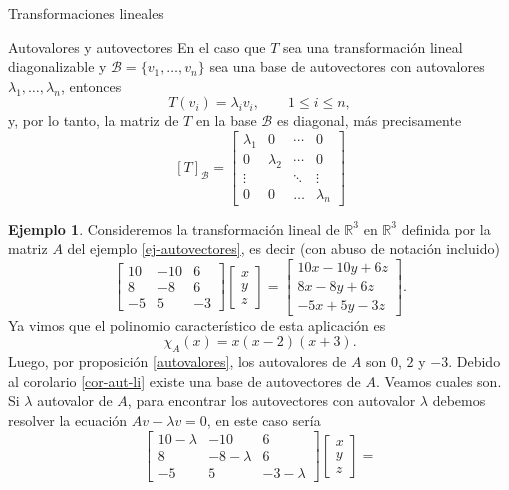\documentclass[a4paper,12pt,twoside,spanish]{amsbook}
\theoremstyle{definition}
\newtheorem{ejemplo}{Ejemplo}[section]
\theoremstyle{remark}
\newcommand{\R}{\mathbb R}
\begin{document}
\begin{chapter}{Transformaciones lineales}
\begin{section}{Autovalores y autovectores}
		En el caso que $T$ sea una transformación lineal diagonalizable y $\mathcal{B} = \{v_1,\ldots,v_n \}$ sea una base de autovectores con autovalores $\lambda_1,\ldots,\lambda_n$, entonces
		$$
		T(v_i) = \lambda_i v_i, \qquad 1 \le i \le n,
		$$ 
		y, por lo tanto, la matriz de $T$ en  la base $\mathcal{B}$ es diagonal, más precisamente
		$$
		[T]_\mathcal{B} = \begin{bmatrix}
		\lambda_1 &0 & \cdots & 0 \\
		0 & \lambda_2 & \cdots &0 \\
		\vdots & &\ddots & \vdots \\
		0 & 0 & \ldots &\lambda_n
		\end{bmatrix}
		$$
		
		\begin{ejemplo} Consideremos la transformación lineal de $\R^3$ en $\R^3$  definida por la matriz $A$ del ejemplo \ref{ej-autovectores},  es decir (con abuso de notación incluido)
			\begin{equation*}
				\begin{bmatrix}10&-10&6\\8& -8& 6\\-5& 5& -3\end{bmatrix}
				\begin{bmatrix} x\\y\\z \end{bmatrix} =
				\begin{bmatrix} 10x-10y+6z\\8x -8y +6z \\-5x+5y-3z\end{bmatrix}.
			\end{equation*}
		Ya vimos que  el  polinomio característico de esta aplicación es 
		$$
		\chi_A(x) = x (x-2)(x+3).
		$$
		Luego, por 	proposición \ref{autovalores}, los autovalores de $A$ son $0$, $2$ y $-3$. Debido al corolario \ref{cor-aut-li} existe una base de autovectores de $A$. Veamos cuales son. Si $\lambda$ autovalor de $A$, para encontrar los autovectores con autovalor $\lambda$  debemos resolver la ecuación $Av -\lambda v=0 $,  en este caso sería
		\begin{equation*}
		\begin{bmatrix}10- \lambda &-10&6\\8& -8- \lambda & 6\\-5& 5& -3- \lambda \end{bmatrix}
		\begin{bmatrix} x\\y\\z \end{bmatrix} =

\end{equation*}
\end{ejemplo}
\end{section}
\end{chapter}
\end{document}

